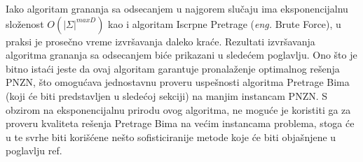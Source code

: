 \documentclass[12pt,oneside]{memoir}
\begin{document}
Iako algoritam grananja sa odsecanjem u najgorem slučaju ima eksponencijalnu složenost $O(|\Sigma|^{maxD})$
kao i algoritam Iscrpne Pretrage (\textit{eng.} Brute Force), u praksi je prosečno vreme izvršavanja
daleko kraće. Rezultati izvršavanja algoritma grananja sa odsecanjem biće prikazani u sledećem poglavlju.
Ono što je bitno istaći jeste da ovaj algoritam garantuje pronalaženje optimalnog rešenja PNZN, što omogućava
jednostavnu proveru uspešnosti algoritma Pretrage Bima (koji će biti predstavljen u sledećoj sekciji)
na manjim instancam PNZN. S obzirom na eksponencijalnu prirodu ovog algoritma, ne moguće je koristiti ga
za proveru kvaliteta rešenja Pretrage Bima na većim instancama problema, stoga će u te svrhe biti korišćene
nešto sofisticiranije metode koje će biti objašnjene u poglavlju ref.

\end{document}
